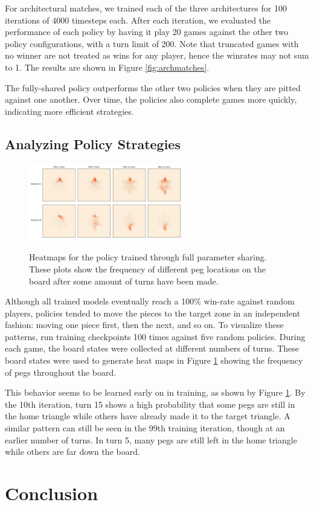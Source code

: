 \documentclass[12pt, a4paper, twocolumn]{article}
\begin{document}
For architectural matches, we trained each of the three architectures for 100 iterations of 4000 timesteps each. After each iteration, we evaluated the performance of each policy by having it play 20 games against the other two policy configurations, with a turn limit of 200. Note that truncated games with no winner are not treated as wins for any player, hence the winrates may not sum to 1. The results are shown in Figure \ref{fig:archmatches}.

The fully-shared policy outperforms the other two policies when they are pitted against one another. Over time, the policies also complete games more quickly, indicating more efficient strategies.

\subsection{Analyzing Policy Strategies}


\begin{figure}[]
  \centering
    \includegraphics[width=0.6\textwidth]{images/random_heatmap.png}
  \label{fig:heatmap}
  \caption{Heatmaps for the policy trained through full parameter sharing. These plots show the frequency of different peg locations on the board after some amount of turns have been made.}
\end{figure}

Although all trained models eventually reach a 100\% win-rate against random players, policies tended to move the pieces to the target zone in an independent fashion: moving one piece first, then the next, and so on. To visualize these patterns, run training checkpoints 100 times against five random policies. During each game, the board states were collected at different numbers of turns. These board states were used to generate heat maps in Figure \ref{fig:heatmap} showing the frequency of pegs throughout the board.



This behavior seems to be learned early on in training, as shown by Figure \ref{fig:heatmap}. By the 10th iteration, turn 15 shows a high probability that some pegs are still in the home triangle while others have already made it to the target triangle. A similar pattern can still be seen in the 99th training iteration, though at an earlier number of turns. In turn 5, many pegs are still left in the home triangle while others are far down the board.

\section{Conclusion}

\lipsum[1]


\nocite{*}


\end{document}
